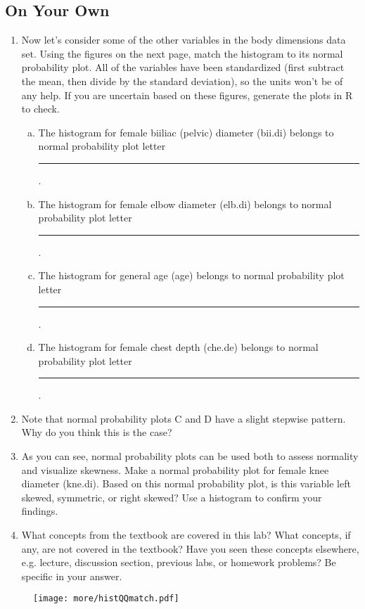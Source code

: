 \documentclass{article}\usepackage[]{graphicx}\usepackage[]{color}
\newcommand{\hlstd}[1]{\textcolor[rgb]{0.345,0.345,0.345}{#1}}%
\begin{document}
\vspace{2cm}

\subsection*{On Your Own}

\begin{enumerate}

\item Now let's consider some of the other variables in the body dimensions data set.  Using the figures on the next page, match the histogram to its normal probability plot.  All of the variables have been standardized (first subtract the mean, then divide by the standard deviation), so the units won't be of any help.  If you are uncertain based on these figures, generate the plots in R to check.

\begin{enumerate}[(a)]

\item The histogram for female biiliac (pelvic) diameter (\hlstd{bii.di}) belongs to normal probability plot letter \rule{0.25in}{1pt}.

\item The histogram for female elbow diameter (\hlstd{elb.di}) belongs to normal probability plot letter \rule{0.25in}{1pt}.

\item The histogram for general age (\hlstd{age}) belongs to normal probability plot letter \rule{0.25in}{1pt}.

\item The histogram for female chest depth (\hlstd{che.de}) belongs to normal probability plot letter \rule{0.25in}{1pt}.

\end{enumerate}

\item Note that normal probability plots C and D have a slight stepwise pattern.  Why do you think this is the case?

\item As you can see, normal probability plots can be used both to assess normality and visualize skewness.  Make a normal probability plot for female knee diameter (\hlstd{kne.di}).  Based on this normal probability plot, is this variable left skewed, symmetric, or right skewed?  Use a histogram to confirm your findings.

\item What concepts from the textbook are covered in this lab?  What concepts, if any, are not covered in the textbook?  Have you seen these concepts elsewhere, e.g. lecture, discussion section, previous labs, or homework problems?  Be specific in your answer.

\end{enumerate}

\newpage

\begin{figure}[h]
   \centering
  \texttt{[image: more/histQQmatch.pdf]}
\end{figure}
\end{document}
